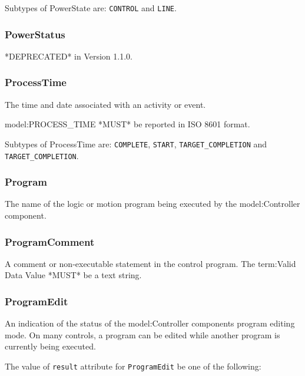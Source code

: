 Subtypes of PowerState are: \texttt{CONTROL} and \texttt{LINE}. 
\FloatBarrier

\subsubsection{PowerStatus}
  \label{sec:PowerStatus}


*DEPRECATED* in Version 1.1.0.

\FloatBarrier

\subsubsection{ProcessTime}
  \label{sec:ProcessTime}


The time and date associated with an activity or event.
  
 {model:PROCESS_TIME} *MUST* be reported in ISO 8601 format.


Subtypes of ProcessTime are: \texttt{COMPLETE}, \texttt{START}, \texttt{TARGET_COMPLETION} and \texttt{TARGET_COMPLETION}. 
\FloatBarrier

\subsubsection{Program}
  \label{sec:Program}


The name of the logic or motion program being executed by the {model:Controller} component.

\FloatBarrier

\subsubsection{ProgramComment}
  \label{sec:ProgramComment}


A comment or non-executable statement in the control program.
 The {term:Valid Data Value} *MUST* be a text string.

\FloatBarrier

\subsubsection{ProgramEdit}
  \label{sec:ProgramEdit}


An indication of the status of the {model:Controller} components program editing mode. 
 On many controls, a program can be edited while another program is currently being executed.


The value of \texttt{result} attribute for \texttt{ProgramEdit} \MUST be one of the following: 

